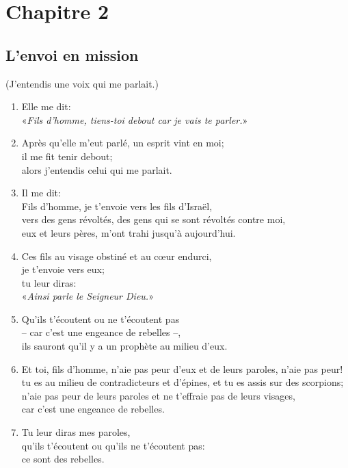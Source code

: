 \noindent
\section*{Chapitre 2}
\subsection*{L'envoi en mission}
(J'entendis une voix qui me parlait.)
\begin{enumerate}[leftmargin=\psleftmargin, labelsep = \pslabelsep, label={\arabic*}, font=\color{\pscolor}\small\textsuperscript, parsep=0em, itemsep=0em, topsep=0em ]
      \item Elle me dit: \\ \decalage «\textit{Fils d’homme, tiens-toi debout car je vais te parler.}»
      \item Après qu’elle m’eut parlé, un esprit vint en moi; \\ il me fit tenir debout; \\ alors j’entendis celui qui me parlait.
      \item Il me dit: \\ Fils d’homme, je t’envoie vers les fils d’Israël, \\ vers des gens révoltés, des gens qui se sont révoltés contre moi, \\ eux et leurs pères, m'ont trahi jusqu’à aujourd’hui.
      \item Ces fils au visage obstiné et au cœur endurci, \\ je t’envoie vers eux; \\ tu leur diras: \\ \decalage «\textit{Ainsi parle le Seigneur Dieu.}»
      \item Qu’ils t’écoutent ou ne t’écoutent pas \\ – car c’est une engeance de rebelles –, \\ ils sauront qu’il y a un prophète au milieu d’eux.\verseSpace
      \item Et toi, fils d’homme, n’aie pas peur d’eux et de leurs paroles, n’aie pas peur! \\ tu es au milieu de contradicteurs et d’épines, et tu es assis sur des scorpions; \\ n’aie pas peur de leurs paroles et ne t’effraie pas de leurs visages, \\ car c’est une engeance de rebelles.
      \item Tu leur diras mes paroles, \\ qu’ils t’écoutent ou qu’ils ne t’écoutent pas: \\ ce sont des rebelles. \verseSpace

\end{enumerate}

